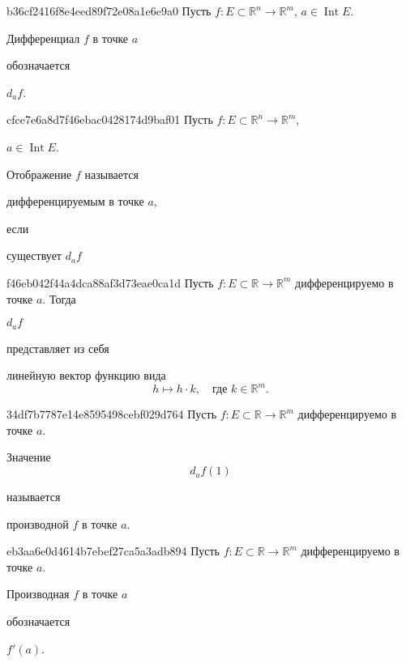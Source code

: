 \begin{note}{b36cf2416f8e4eed89f72e08a1e6e9a0}
    Пусть \({ f : E  \subset \mathbb R^{n} \to \mathbb R^{m} }\), \({ a \in \operatorname{Int} E }\).
    \begin{icloze}{2}Дифференциал \({ f }\) в точке \({ a }\)\end{icloze} обозначается \begin{icloze}{1}\({ d_a f }\).\end{icloze}
\end{note}

\begin{note}{cfce7e6a8d7f46ebac0428174d9baf01}
    Пусть \({ f : E  \subset \mathbb R^{n} \to \mathbb R^{m} }\), \begin{icloze}{3}\({ a \in \operatorname{Int} E }\).\end{icloze}
    Отображение \({ f }\) называется \begin{icloze}{2}дифференцируемым в точке \({ a }\),\end{icloze} если \begin{icloze}{1}существует \({ d_a f }\)\end{icloze}
\end{note}

\begin{note}{f46eb042f44a4dca88af3d73eae0ca1d}
    Пусть \({ f : E \subset \mathbb R \to \mathbb R^{m} }\) дифференцируемо в точке \({ a }\).
    Тогда \begin{icloze}{2}\({ d_{a} f }\)\end{icloze} представляет из себя
    \begin{icloze}{1}линейную вектор функцию вида
        \[
            h \mapsto h \cdot k, \quad \text{где \({ k \in \mathbb R^{m} }\)}.
        \]
    \end{icloze}
\end{note}

\begin{note}{34df7b7787e14e8595498cebf029d764}
    Пусть \({ f : E \subset \mathbb R \to \mathbb R^{m} }\) дифференцируемо в точке \({ a }\).
    \begin{icloze}{2}
        Значение
        \[
            d_{a}f(1)
        \]
    \end{icloze}
    называется \begin{icloze}{1}производной \({ f }\) в точке \({ a }\).\end{icloze}
\end{note}

\begin{note}{eb3aa6e0d4614b7ebef27ca5a3adb894}
    Пусть \({ f : E \subset \mathbb R \to \mathbb R^{m} }\) дифференцируемо в точке \({ a }\).
    \begin{icloze}{2}Производная \({ f }\) в точке \({ a }\)\end{icloze} обозначается \begin{icloze}{1}\({ f'(a) }\).\end{icloze}
\end{note}


